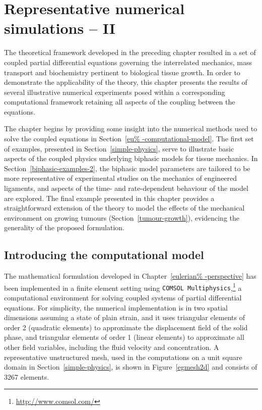 \chapter{Representative numerical simulations -- II}
\label{numerical-simulations-2}

The theoretical framework developed in the preceding chapter resulted
in a set of coupled partial differential equations governing the
interrelated mechanics, mass transport and biochemistry pertinent to
biological tissue growth. In order to demonstrate the applicability of
the theory, this chapter presents the results of several illustrative
numerical experiments posed within a corresponding computational
framework retaining all aspects of the coupling between the equations.

The chapter begins by providing some insight into the numerical
methods used to solve the coupled equations in Section~\ref{eu%
  -computational-model}. The first set of examples, presented in
Section~\ref{simple-physics}, serve to illustrate basic aspects of the
coupled physics underlying biphasic models for tissue mechanics. In
Section~\ref{biphasic-examples-2}, the biphasic model parameters are
tailored to be more representative of experimental studies on the
mechanics of engineered ligaments, and aspects of the time- and
rate-dependent behaviour of the model are explored. The final example
presented in this chapter 
provides a straightforward extension of the theory to model the
effects of the mechanical environment on growing tumours
(Section~\ref{tumour-growth}), evidencing the generality of the
proposed formulation.

\section{Introducing the computational model}
\label{eu-computational-model}

The mathematical formulation developed in Chapter~\ref{eulerian%
  -perspective} has been implemented in a finite element setting using
{\tt COMSOL Multiphysics},\footnote{\href {http://www.comsol.com/}
  {http://www.comsol.com/}} a computational environment for solving
coupled systems of partial differential equations. For simplicity, the
numerical implementation is in two spatial dimensions assuming a state
of plain strain, and it uses triangular elements of order 2 (quadratic
elements) to approximate the displacement field of the solid phase,
and triangular elements of order 1 (linear elements) to approximate
all other field variables, including the fluid velocity and
concentration. A representative unstructured mesh, used in the
computations on a unit square domain in Section~\ref{simple-physics},
is shown in Figure~\ref{egmesh2d} and consists of 3267 elements.

